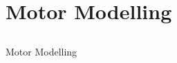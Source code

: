 \section{Motor Modelling}

%
%
%
%
%
%
%


\subsection{}
{
\begin{frame}{Motor Modelling}

	\vspace{-3mm}
   	\begin{figure}
 	\end{figure}



\end{frame}
}




